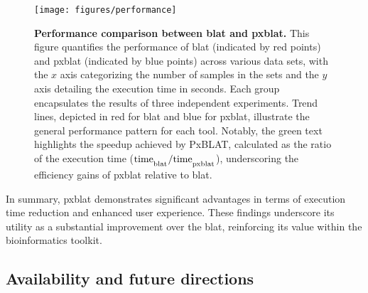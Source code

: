 \documentclass[10pt,letterpaper]{article}
\begin{document}
\begin{figure}[!h]
	\caption{{\bf Performance comparison between \gls{blat} and \gls{pxblat}.} This figure quantifies the performance of \gls{blat} (indicated by red points) and \gls{pxblat} (indicated by blue points) across various data sets, with the \(x\) axis categorizing the number of samples in the sets and the \(y\) axis detailing the execution time in seconds.
		Each group encapsulates the results of three independent experiments.
		Trend lines, depicted in red for \gls{blat} and blue for \gls{pxblat}, illustrate the general performance pattern for each tool.
		Notably, the green text highlights the speedup achieved by PxBLAT, calculated as the ratio of the execution time (\(\mathrm{time}_\textsubscript{blat} / \mathrm{time}_\textsubscript{pxblat}\)), underscoring the efficiency gains of \gls{pxblat} relative to \gls{blat}.}
	\texttt{[image: figures/performance]}
	\label{fig:performance}
\end{figure}

In summary, \gls{pxblat} demonstrates significant advantages in terms of execution time reduction and enhanced user experience.
These findings underscore its utility as a substantial improvement over the \gls{blat}, reinforcing its value within the bioinformatics toolkit.

\subsection*{Availability and future directions}
\end{document}
